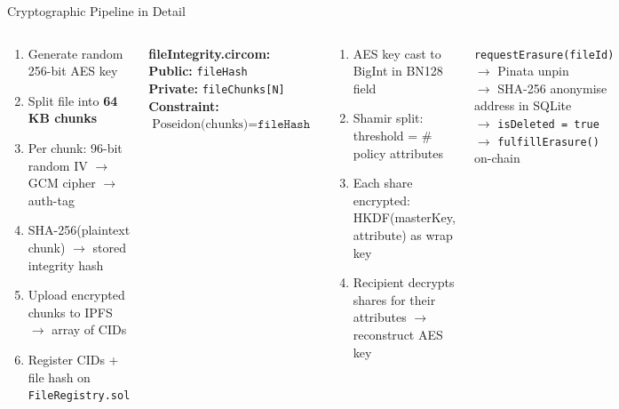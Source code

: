 \documentclass[aspectratio=169]{beamer}
\begin{document}
\begin{frame}{Cryptographic Pipeline in Detail}
\begin{columns}[t]
\begin{tcolorbox}[bluebox, title=\textbf{File Encryption (AES-256-GCM)}]
\tiny
\begin{enumerate}
  \item Generate random 256-bit AES key
  \item Split file into \textbf{64\,KB chunks}
  \item Per chunk: 96-bit random IV $\to$ GCM cipher $\to$ auth-tag
  \item SHA-256(plaintext chunk) $\to$ stored integrity hash
  \item Upload encrypted chunks to IPFS $\to$ array of CIDs
  \item Register CIDs + file hash on \texttt{FileRegistry.sol}
\end{enumerate}
\end{tcolorbox}
\vspace{0.12cm}
\begin{tcolorbox}[navybox, title=\textbf{ZKP --- Groth16 Circuits}]
\tiny
\textbf{fileIntegrity.circom:}\\[2pt]
\textbf{Public:} \texttt{fileHash} \\
\textbf{Private:} \texttt{fileChunks[N]}\\
\textbf{Constraint:} $\text{Poseidon(chunks)} = \texttt{fileHash}$
\end{tcolorbox}
\begin{tcolorbox}[bluebox, title=\textbf{CP-ABE Key Wrapping}]
\scriptsize
\begin{enumerate}
  \item AES key cast to BigInt in BN128 field
  \item Shamir split: threshold = \# policy attributes
  \item Each share encrypted: HKDF(masterKey, attribute) as wrap key
  \item Recipient decrypts shares for their attributes $\to$ reconstruct AES key
\end{enumerate}
\end{tcolorbox}
\vspace{0.12cm}
\begin{tcolorbox}[greenbox, title=\textbf{GDPR Erasure Pipeline}]
\scriptsize
\texttt{requestErasure(fileId)} $\to$ Pinata unpin\\
$\to$ SHA-256 anonymise address in SQLite\\
$\to$ \texttt{isDeleted = true}\\
$\to$ \texttt{fulfillErasure()} on-chain
\end{tcolorbox}
\end{columns}
\end{frame}
\end{document}
